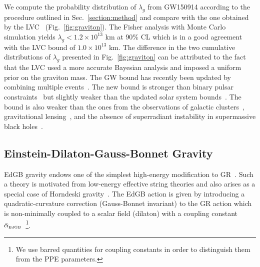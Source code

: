 \documentclass[prd,twocolumn,nofootinbib]{revtex4-1}
\newcommand{\EDGB}{{\mbox{\tiny EdGB}}}
\begin{document}
We compute the probability distribution of $\lambda_g$ from GW150914 according to the procedure outlined in Sec.~\ref{section:method} and compare with the one obtained by the LVC~\cite{TheLIGOScientific:2016src} (Fig.~\ref{fig:graviton}). The Fisher analysis with Monte Carlo simulation yields $\lambda_g<1.2\times 10^{13}$ km at 90\% CL which is in a good agreement with the LVC bound of $1.0\times10^{13}$ km. The difference in the two cumulative distributions of $\lambda_g$ presented in Fig.~\ref{fig:graviton} can be attributed to the fact that the LVC used a more accurate Bayesian analysis and imposed a uniform prior on the graviton mass.
The GW bound has recently been updated by combining multiple events~\cite{LIGOScientific:2019fpa}. The new bound is stronger than binary pulsar constraints~\cite{Finn:2001qi,Miao:2019nhf} but slightly weaker than the updated solar system bounds~\cite{Will:2018gku}. The bound is also weaker than the ones from the observations of galactic clusters~\cite{Goldhaber:1974wg}, gravitational lensing~\cite{Choudhury:2002pu}, and the absence of superradiant instability in supermassive black holes~\cite{Brito:2013wya}.

\subsection{Einstein-Dilaton-Gauss-Bonnet Gravity}\label{EdGB}
EdGB gravity endows one of the simplest high-energy modification to GR~\cite{Moura:2006pz,Pani:2009wy}. Such a theory is motivated from low-energy effective string theories and also arises as a special case of Horndeski gravity~\cite{Zhang:2017unx,Berti:2015itd}. 
The EdGB action is given by introducing a quadratic-curvature correction (Gauss-Bonnet invariant) to the GR action which is non-minimally coupled to a scalar field (dilaton) with a coupling constant $\bar{\alpha}_\EDGB$~\cite{Kanti:1995vq}\footnote{We use barred quantities for coupling constants in order to distinguish them from the PPE parameters.}.
\end{document}
